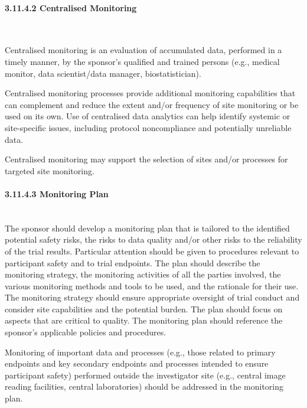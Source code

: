 \documentclass[11pt]{article}
\begin{document}
\paragraph{3.11.4.2 Centralised Monitoring}\mbox{}\\

\begin{description}[leftmargin=2.5cm,style=sameline]

\item[(a)] Centralised monitoring is an evaluation of accumulated data, performed in a timely manner, by the sponsor's qualified and trained persons (e.g., medical monitor, data scientist/data manager, biostatistician).

\item[(b)] Centralised monitoring processes provide additional monitoring capabilities that can complement and reduce the extent and/or frequency of site monitoring or be used on its own. Use of centralised data analytics can help identify systemic or site-specific issues, including protocol noncompliance and potentially unreliable data.

\item[(c)] Centralised monitoring may support the selection of sites and/or processes for targeted site monitoring.

\end{description}

\paragraph{3.11.4.3 Monitoring Plan}\mbox{}\\

The sponsor should develop a monitoring plan that is tailored to the identified potential safety risks, the risks to data quality and/or other risks to the reliability of the trial results. Particular attention should be given to procedures relevant to participant safety and to trial endpoints. The plan should describe the monitoring strategy, the monitoring activities of all the parties involved, the various monitoring methods and tools to be used, and the rationale for their use. The monitoring strategy should ensure appropriate oversight of trial conduct and consider site capabilities and the potential burden. The plan should focus on aspects that are critical to quality. The monitoring plan should reference the sponsor's applicable policies and procedures.


Monitoring of important data and processes (e.g., those related to primary endpoints and key secondary endpoints and processes intended to ensure participant safety) performed outside the investigator site (e.g., central image reading facilities, central laboratories) should be addressed in the monitoring plan.
\end{document}
